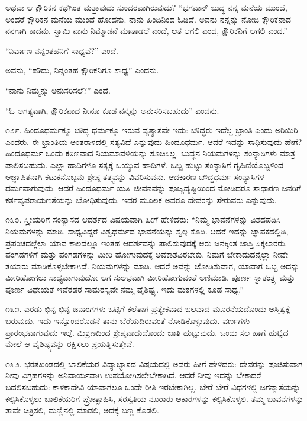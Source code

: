 ಅಥವಾ ಆ ಕ್ಷೌರಿಕನ ಕಥೆಗಿಂತ ಮತ್ತಾವುದು ಸುಂದರವಾಗಿರುವುದು? “ಭಗವಾನ್ ಬುದ್ಧ ನನ್ನ ಮನೆಯ ಮುಂದೆ, ಅಂದರೆ ಕ್ಷೌರಿಕನ ಮನೆಯ ಮುಂದೆ ಹೋದನು. ನಾನು ಹಿಂದಿನಿಂದ ಓಡಿದೆ. ಅವನು ನನ್ನನ್ನು ನೋಡಿ ಕ್ಷೌರಿಕನಾದ ನನಗಾಗಿ ಕಾದನು. ಸ್ವಾಮಿ ನಾನು ನಿಮ್ಮೊಡನೆ ಮಾತಾಡಲೆ ಎಂದೆ, ಆತ ಆಗಲಿ ಎಂದ, ಕ್ಷೌರಿಕನಿಗೆ ಆಗಲಿ ಎಂದ.”

“ನಿರ್ವಾಣ ನನ್ನಂತಹನಿಗೆ ಸಾಧ್ಯವೆ?” ಎಂದೆ.

ಅವನು, “ಹೌದು, ನಿನ್ನಂತಹ ಕ್ಷೌರಿಕನಿಗೂ ಸಾಧ್ಯ” ಎಂದನು.

“ನಾನು ನಿಮ್ಮನ್ನು ಅನುಸರಿಸಲೆ?” ಎಂದೆ.

“ಓ ಅಗತ್ಯವಾಗಿ, ಕ್ಷೌರಿಕನಾದ ನೀನೂ ಕೂಡ ನನ್ನನ್ನು ಅನುಸರಿಸಬಹುದು” ಎಂದನು.

೧೨೯. ಹಿಂದೂಧರ್ಮಕ್ಕೂ ಬೌದ್ಧ ಧರ್ಮಕ್ಕೂ ಇರುವ ವ್ಯತ್ಯಾಸವೇ ಇದು: ಬೌದ್ಧರು ಇದೆಲ್ಲ ಭ್ರಾಂತಿ ಎಂದು ಅರಿಯಿರಿ ಎಂದರು. ಈ ಭ್ರಾಂತಿಯ ಅಂತರಾಳದಲ್ಲಿ ಸತ್ಯವಿದೆ ಎನ್ನುವುದು ಹಿಂದೂಧರ್ಮ. ಆದರೆ ಇದನ್ನು ಸಾಧಿಸುವುದು ಹೇಗೆ? ಹಿಂದೂಧರ್ಮ ಒಂದು ಕಠಿಣವಾದ ನಿಯಮಾವಳಿಯನ್ನು ಸೂಚಿಸಿಲ್ಲ. ಬುದ್ಧನ ನಿಯಮಗಳನ್ನು ಸಂನ್ಯಾಸಿಗಳು ಮಾತ್ರ ಪಾಲಿಸಬಹುದು. ಎಲ್ಲಾ ಹಾದಿಗಳೂ ಸತ್ಯಕ್ಕೆ ಒಯ್ಯುವ ಹಾದಿಗಳೆ. ಒಬ್ಬ ಹುಟ್ಟು ಸಂನ್ಯಾಸಿಗೆ ಗೃಹಿಣಿಯೊಬ್ಬಳಿಂದ ಆಜ್ಞಾಪಿತನಾಗಿ ಕಟುಕನೊಬ್ಬನು ಶ್ರೇಷ್ಠ ತತ್ತ್ವವನ್ನು ವಿವರಿಸುವನು. ಆದಕಾರಣ ಬೌದ್ಧಧರ್ಮ ಸಂನ್ಯಾಸಿಗಳ ಧರ್ಮವಾಗುವುದು. ಆದರೆ ಹಿಂದೂಧರ್ಮ ಯತಿ–ಜೀವನವನ್ನು ಪೂಜ್ಯದೃಷ್ಟಿಯಿಂದ ನೋಡಿದರೂ ಸಾಧಾರಣ ಜನರಿಗೆ ಕರ್ತವ್ಯಪರಾಯಣತೆಯನ್ನು ಬೋಧಿಸುವುದು. ಇದರ ಮೂಲಕ ಅವರೂ ದೇವರನ್ನು ಸೇರುವರು ಎನ್ನುವುದು.

೧೩೦. ಸ್ತ್ರೀಯರಿಗೆ ಸಂನ್ಯಾಸದ ಆದರ್ಶದ ವಿಷಯವಾಗಿ ಹೀಗೆ ಹೇಳಿದರು: “ನಿಮ್ಮ ಭಾವನೆಗಳನ್ನು ವಿಶದಪಡಿಸಿ ನಿಯಮಗಳನ್ನು ಮಾಡಿ. ಸಾಧ್ಯವಿದ್ದರೆ ವಿಶ್ವಧರ್ಮದ ಭಾವನೆಯನ್ನು ಸ್ವಲ್ಪ ಕೊಡಿ. ಆದರೆ ಇದನ್ನು ಜ್ಞಾಪಕದಲ್ಲಿಡಿ, ಪ್ರಪಂಚದಲ್ಲೆಲ್ಲಾ ಯಾವ ಕಾಲದಲ್ಲೂ ಇಂತಹ ಆದರ್ಶವನ್ನು ಪಾಲಿಸುವುದಕ್ಕೆ ಆರು ಜನಕ್ಕಿಂತ ಜಾಸ್ತಿ ಸಿಕ್ಕಲಾರರು. ಪಂಗಡಗಳಿಗೆ ಮತ್ತು ಪಂಗಡಗಳನ್ನು ಮೀರಿ ಹೋಗುವುದಕ್ಕೆ ಅವಕಾಶವಿರಬೇಕು. ನಿಮಗೆ ಬೇಕಾದುದನ್ನೆಲ್ಲಾ ನೀವೇ ತಯಾರು ಮಾಡಿಕೊಳ್ಳಬೇಕಾಗಿದೆ. ನಿಯಮಗಳನ್ನು ಮಾಡಿ. ಆದರೆ ಅವನ್ನು ಜೋಡಿಸುವಾಗ, ಯಾವಾಗ ಒಬ್ಬ ಅದನ್ನು ಮೀರಿಹೋಗಲು ಸಾಧ್ಯವಾಗುವುದೋ ಆಗ ಸುಲಭವಾಗಿ ಮೀರಿಹೋಗುವಂತೆ ಅಣಿಮಾಡಿ. ಪೂರ್ಣ ಸ್ವಾತಂತ್ರ್ಯ ಮತ್ತು ಪೂರ್ಣ ವಿಧೇಯತೆ ಇವೆರಡರ ಸಾಮರಸ್ಯವೇ ನಮ್ಮ ವೈಶಿಷ್ಟ್ಯ. ಇದು ಮಠಗಳಲ್ಲಿ ಕೂಡ ಸಾಧ್ಯ.”

೧೩೧. ಎರಡು ಭಿನ್ನ ಭಿನ್ನ ಜನಾಂಗಗಳು ಒಟ್ಟಿಗೆ ಕಲೆತಾಗ ಪ್ರತ್ಯೇಕವಾದ ಬಲವಾದ ಮೂರನೆಯದೊಂದು ಅಸ್ತಿತ್ವಕ್ಕೆ ಬರುವುದು. ಇದು ಇನ್ನೊಂದರೊಡನೆ ತಾನು ಬೆರೆಯದಿರುವಂತೆ ನೋಡಿಕೊಳ್ಳುವುದು. ವರ್ಣಗಳು ಪ್ರಾರಂಭವಾಗುವುದು ಇಲ್ಲೆ. ಮಿಶ್ರಣದಿಂದ ಶ್ರೇಷ್ಠವಾದುದೊಂದು ಜಾತಿ ಹುಟ್ಟುವುದು. ಒಂದು ಸಲ ಹಾಗೆ ಹುಟ್ಟಿದ ಮೇಲೆ ಆ ವೈಶಿಷ್ಟ್ಯವನ್ನು ರಕ್ಷಿಸಲು ಪ್ರಯತ್ನಿಸುತ್ತೇವೆ.

೧೩೨. ಭರತಖಂಡದಲ್ಲಿ ಬಾಲಿಕೆಯರ ವಿದ್ಯಾಭ್ಯಾಸದ ವಿಷಯದಲ್ಲಿ ಅವರು ಹೀಗೆ ಹೇಳಿದರು: ದೇವರನ್ನು ಪೂಜಿಸುವಾಗ ನೀವು ವಿಗ್ರಹಗಳನ್ನು ಅನಿವಾರ್ಯವಾಗಿ ಉಪಯೋಗಿಸಲೇಬೇಕಾಗಿದೆ. ಆದರೆ ನೀವು ಇದನ್ನು ಬೇಕಾದರೆ ಬದಲಿಸಬಹುದು: ಕಾಳಿಕಾದೇವಿ ಯಾವಾಗಲೂ ಒಂದೇ ರೀತಿ ಇರಬೇಕಾಗಿಲ್ಲ. ಬೇರೆ ಬೇರೆ ವಿಧಗಳಲ್ಲಿ ಜಗನ್ಮಾತೆಯನ್ನು ಕಲ್ಪಿಸಿಕೊಳ್ಳಲು ಬಾಲಿಕೆಯರಿಗೆ ಪ್ರೋತ್ಸಾಹಿಸಿ, ಸರಸ್ವತಿಯ ನೂರಾರು ಆಕಾರಗಳನ್ನು ಕಲ್ಪಿಸಿಕೊಳ್ಳಲಿ. ತಮ್ಮ ಭಾವನೆಗಳನ್ನು ತಾವೇ ಚಿತ್ರಿಸಲಿ, ಮಣ್ಣಿನಲ್ಲಿ ಮಾಡಲಿ, ಅದಕ್ಕೆ ಬಣ್ಣ ಕೊಡಲಿ.

